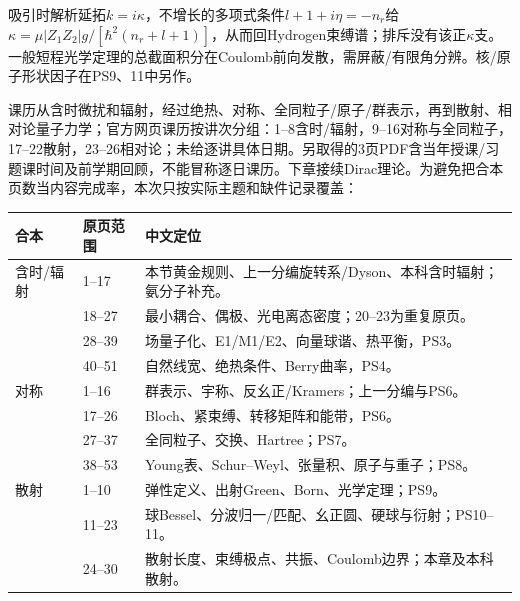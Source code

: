吸引时解析延拓$k=i\kappa$，不增长的多项式条件$l+1+i\eta=-n_r$给$\kappa=\mu|Z_1Z_2|g/[\hbar^2(n_r+l+1)]$，从而回Hydrogen束缚谱；排斥没有该正$\kappa$支。一般短程光学定理的总截面积分在Coulomb前向发散，需屏蔽/有限角分辨。核/原子形状因子在PS9、11中另作。

课历从含时微扰和辐射，经过绝热、对称、全同粒子/原子/群表示，再到散射、相对论量子力学；官方网页课历按讲次分组：1--8含时/辐射，9--16对称与全同粒子，17--22散射，23--26相对论；未给逐讲具体日期。另取得的3页PDF含当年授课/习题课时间及前学期回顾，不能冒称逐日课历。下章接续Dirac理论。为避免把合本页数当内容完成率，本次只按实际主题和缺件记录覆盖：
\begin{longtable}{p{}p{}p{}}
\toprule 合本 & 原页范围 & 中文定位\\\midrule\endhead
含时/辐射 & 1--17 & 本节黄金规则、上一分编旋转系/Dyson、本科含时辐射；氨分子补充。\\
 & 18--27 & 最小耦合、偶极、光电离态密度；20--23为重复原页。\\
 & 28--39 & 场量子化、E1/M1/E2、向量球谐、热平衡，PS3。\\
 & 40--51 & 自然线宽、绝热条件、Berry曲率，PS4。\\
对称 & 1--16 & 群表示、宇称、反幺正/Kramers；上一分编与PS6。\\
 & 17--26 & Bloch、紧束缚、转移矩阵和能带，PS6。\\
 & 27--37 & 全同粒子、交换、Hartree；PS7。\\
 & 38--53 & Young表、Schur--Weyl、张量积、原子与重子；PS8。\\
散射 & 1--10 & 弹性定义、出射Green、Born、光学定理；PS9。\\
 & 11--23 & 球Bessel、分波归一/匹配、幺正圆、硬球与衍射；PS10--11。\\
 & 24--30 & 散射长度、束缚极点、共振、Coulomb边界；本章及本科散射。\\
\bottomrule\end{longtable}
